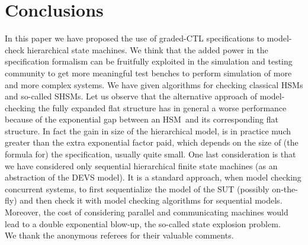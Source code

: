 \documentclass[letterpaper,twocolumn,10pt]{article}
\newcommand{\VHSM}{SHSM}
\newcommand{\HSM}{HSM}
\begin{document}
\section{Conclusions}\label{sec:Conclusions}
In this paper we have proposed the use of graded-CTL specifications to model-check
hierarchical state machines. We think that the added power in the specification formalism can be fruitfully
exploited in the simulation and testing community to get more meaningful test benches to
perform simulation of more and more complex systems.
We have given algorithms for checking classical \HSM s and so-called \VHSM s.
Let us observe that the alternative approach of model-checking the
fully expanded flat structure
has in general a worse performance because of the exponential gap between an \HSM\ and its corresponding
flat structure. In fact the gain in size of the hierarchical model, is in practice
much greater than the extra exponential factor paid, which depends on the size of (the formula for)
the spe\-ci\-fication, usually quite small.
One last consideration is that we have considered only sequential hierarchical finite state
machines (as an abstraction of the DEVS model).
It is a standard approach, when model checking concurrent systems, to first sequentialize
the model of the SUT (possibly on-the-fly) and then check it with model checking algorithms
for sequential models.
Moreover, the cost of considering
parallel and communicating machines would lead to a double exponential blow-up, the so-called
state explosion problem.
\\ We thank the anonymous referees for their valuable
comments.

\end{document}
